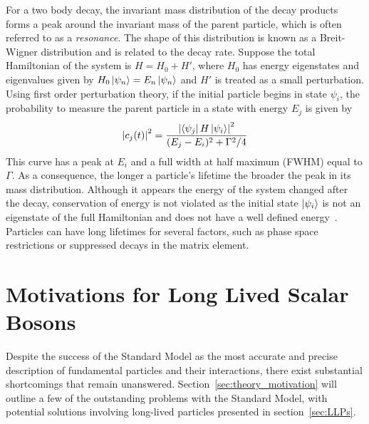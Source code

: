 For a two body decay, the invariant mass distribution of the decay products forms a peak around the invariant mass of the parent particle, which is often referred to as a \textit{resonance}. The shape of this distribution is known as a Breit-Wigner distribution and is related to the decay rate. Suppose the total Hamiltonian of the system is $H=H_0+H'$, where $H_0$ has energy eigenstates and eigenvalues given by $H_0\ket{\psi_n}=E_n\ket{\psi_n}$ and $H'$ is treated as a small perturbation. Using first order perturbation theory, if the initial particle begins in state $\psi_i$, the probability to measure the parent particle in a state with energy $E_j$ is given by
\begin{equation}
	\left|c_j(t)\right|^2=\frac{\left|\bra{\psi_j}H\ket{\psi_i}\right|^2}{(E_j-E_i)^2+\Gamma^2/4}
\end{equation}
This curve has a peak at $E_i$ and a full width at half maximum (FWHM) equal to $\Gamma$. As a consequence, the longer a particle's lifetime the broader the peak in its mass distribution. Although it appears the energy of the system changed after the decay, conservation of energy is not violated as the initial state $\ket{\psi_i}$ is not an eigenstate of the full Hamiltonian and does not have a well defined energy~\cite{breitwigner}. Particles can have long lifetimes for several factors, such as phase space restrictions or suppressed decays in the matrix element.

\section{Motivations for Long Lived Scalar Bosons} \label{sec:BSM}
Despite the success of the Standard Model as the most accurate and precise description of fundamental particles and their interactions, there exist substantial shortcomings that remain unanswered. Section~\ref{sec:theory_motivation} will outline a few of the outstanding problems with the Standard Model, with potential solutions involving long-lived particles presented in section~\ref{sec:LLPs}.

